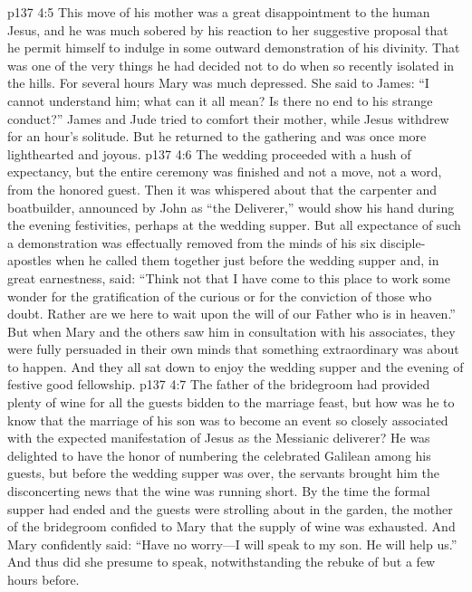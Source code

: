 \vs p137 4:5 This move of his mother was a great disappointment to the human Jesus, and he was much sobered by his reaction to her suggestive proposal that he permit himself to indulge in some outward demonstration of his divinity. That was one of the very things he had decided not to do when so recently isolated in the hills. For several hours Mary was much depressed. She said to James: “I cannot understand him; what can it all mean? Is there no end to his strange conduct?” James and Jude tried to comfort their mother, while Jesus withdrew for an hour’s solitude. But he returned to the gathering and was once more lighthearted and joyous.
\pc \vs p137 4:6 The wedding proceeded with a hush of expectancy, but the entire ceremony was finished and not a move, not a word, from the honored guest. Then it was whispered about that the carpenter and boatbuilder, announced by John as “the Deliverer,” would show his hand during the evening festivities, perhaps at the wedding supper. But all expectance of such a demonstration was effectually removed from the minds of his six disciple\hyp{}apostles when he called them together just before the wedding supper and, in great earnestness, said: \textcolor{ubdarkred}{“Think not that I have come to this place to work some wonder for the gratification of the curious or for the conviction of those who doubt. Rather are we here to wait upon the will of our Father who is in heaven.”} But when Mary and the others saw him in consultation with his associates, they were fully persuaded in their own minds that something extraordinary was about to happen. And they all sat down to enjoy the wedding supper and the evening of festive good fellowship.
\pc \vs p137 4:7 The father of the bridegroom had provided plenty of wine for all the guests bidden to the marriage feast, but how was he to know that the marriage of his son was to become an event so closely associated with the expected manifestation of Jesus as the Messianic deliverer? He was delighted to have the honor of numbering the celebrated Galilean among his guests, but before the wedding supper was over, the servants brought him the disconcerting news that the wine was running short. By the time the formal supper had ended and the guests were strolling about in the garden, the mother of the bridegroom confided to Mary that the supply of wine was exhausted. And Mary confidently said: “Have no worry---I will speak to my son. He will help us.” And thus did she presume to speak, notwithstanding the rebuke of but a few hours before.
